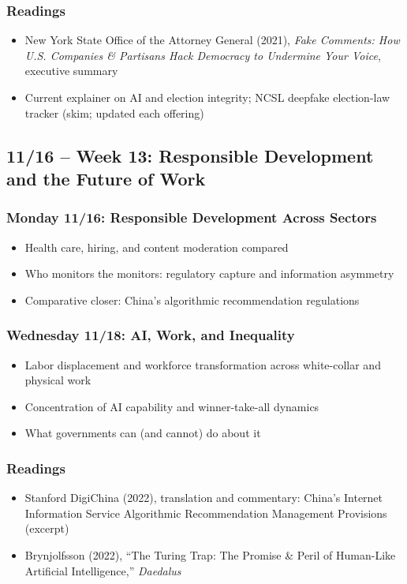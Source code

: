 \documentclass[12pt]{article}
\begin{document}
    \subsubsection*{Readings}
        \begin{itemize}
            \item New York State Office of the Attorney General (2021), \emph{Fake Comments: How U.S. Companies \& Partisans Hack Democracy to Undermine Your Voice}, executive summary
            \item Current explainer on AI and election integrity; NCSL deepfake election-law tracker (skim; updated each offering)
        \end{itemize}

\subsection*{11/16 -- Week 13: Responsible Development and the Future of Work}
    \subsubsection*{Monday 11/16: Responsible Development Across Sectors}
        \begin{itemize}
            \item Health care, hiring, and content moderation compared
            \item Who monitors the monitors: regulatory capture and information asymmetry
            \item Comparative closer: China's algorithmic recommendation regulations
        \end{itemize}
    \subsubsection*{Wednesday 11/18: AI, Work, and Inequality}
        \begin{itemize}
            \item Labor displacement and workforce transformation across white-collar and physical work
            \item Concentration of AI capability and winner-take-all dynamics
            \item What governments can (and cannot) do about it
        \end{itemize}
    \subsubsection*{Readings}
        \begin{itemize}
            \item Stanford DigiChina (2022), translation and commentary: China's Internet Information Service Algorithmic Recommendation Management Provisions (excerpt)
            \item Brynjolfsson (2022), ``The Turing Trap: The Promise \& Peril of Human-Like Artificial Intelligence,'' \emph{Daedalus}
        \end{itemize}
\end{document}
